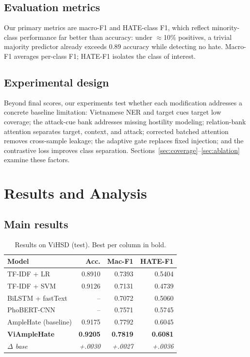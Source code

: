 \documentclass[11pt]{article}
\begin{document}
\subsection{Evaluation metrics}
Our primary metrics are macro-F1 and HATE-class F1, which reflect minority-class performance far better than accuracy: under $\approx$10\% positives, a trivial majority predictor already exceeds 0.89 accuracy while detecting no hate. Macro-F1 averages per-class F1; HATE-F1 isolates the class of interest.

\subsection{Experimental design}
Beyond final scores, our experiments test whether each modification addresses a concrete baseline limitation: Vietnamese NER and target cues target low coverage; the attack-cue bank addresses missing hostility modeling; relation-bank attention separates target, context, and attack; corrected batched attention removes cross-sample leakage; the adaptive gate replaces fixed injection; and the contrastive loss improves class separation. Sections~\ref{sec:coverage}--\ref{sec:ablation} examine these factors.

\section{Results and Analysis}

\subsection{Main results}

\begin{table}[t]
  \centering
  \small
  \begin{tabular}{lrrr}
    \toprule
    \textbf{Model} & \textbf{Acc.} & \textbf{Mac-F1} & \textbf{HATE-F1} \\
    \midrule
    TF-IDF + LR          & 0.8910 & 0.7393 & 0.5404 \\
    TF-IDF + SVM         & 0.9126 & 0.7131 & 0.4739 \\
    BiLSTM + fastText    & --     & 0.7072 & 0.5060 \\
    PhoBERT-CNN          & --     & 0.7571 & 0.5745 \\
    AmpleHate (baseline) & 0.9175 & 0.7792 & 0.6045 \\
    \textbf{ViAmpleHate} & \textbf{0.9205} & \textbf{0.7819} & \textbf{0.6081} \\
    \textit{$\Delta$ base} & \textit{+.0030} & \textit{+.0027} & \textit{+.0036} \\
    \bottomrule
  \end{tabular}
  \caption{Results on ViHSD (test). Best per column in bold.}
  \label{tab:vihsd}
\end{table}
\end{document}

